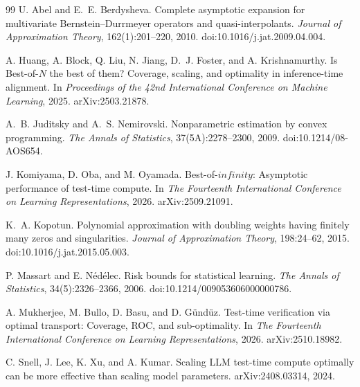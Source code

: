 \documentclass[11pt]{article}
\def\infty{infinity}%
\begin{document}
\begin{thebibliography}{99}
U. Abel and E.~E. Berdysheva.
\newblock Complete asymptotic expansion for multivariate Bernstein--Durrmeyer operators and quasi-interpolants.
\newblock \emph{Journal of Approximation Theory}, 162(1):201--220, 2010.
\newblock doi:10.1016/j.jat.2009.04.004.

A. Huang, A. Block, Q. Liu, N. Jiang, D.~J. Foster, and A. Krishnamurthy.
\newblock Is Best-of-$N$ the best of them? Coverage, scaling, and optimality in inference-time alignment.
\newblock In \emph{Proceedings of the 42nd International Conference on Machine Learning}, 2025.
\newblock arXiv:2503.21878.

A.~B. Juditsky and A.~S. Nemirovski.
\newblock Nonparametric estimation by convex programming.
\newblock \emph{The Annals of Statistics}, 37(5A):2278--2300, 2009.
\newblock doi:10.1214/08-AOS654.

J. Komiyama, D. Oba, and M. Oyamada.
\newblock Best-of-$\infty$: Asymptotic performance of test-time compute.
\newblock In \emph{The Fourteenth International Conference on Learning Representations}, 2026.
\newblock arXiv:2509.21091.

K.~A. Kopotun.
\newblock Polynomial approximation with doubling weights having finitely many zeros and singularities.
\newblock \emph{Journal of Approximation Theory}, 198:24--62, 2015.
\newblock doi:10.1016/j.jat.2015.05.003.

P. Massart and E. N\'ed\'elec.
\newblock Risk bounds for statistical learning.
\newblock \emph{The Annals of Statistics}, 34(5):2326--2366, 2006.
\newblock doi:10.1214/009053606000000786.

A. Mukherjee, M. Bullo, D. Basu, and D. G\"und\"uz.
\newblock Test-time verification via optimal transport: Coverage, ROC, and sub-optimality.
\newblock In \emph{The Fourteenth International Conference on Learning Representations}, 2026.
\newblock arXiv:2510.18982.

C. Snell, J. Lee, K. Xu, and A. Kumar.
\newblock Scaling LLM test-time compute optimally can be more effective than scaling model parameters.
\newblock arXiv:2408.03314, 2024.


\end{thebibliography}
\end{document}
